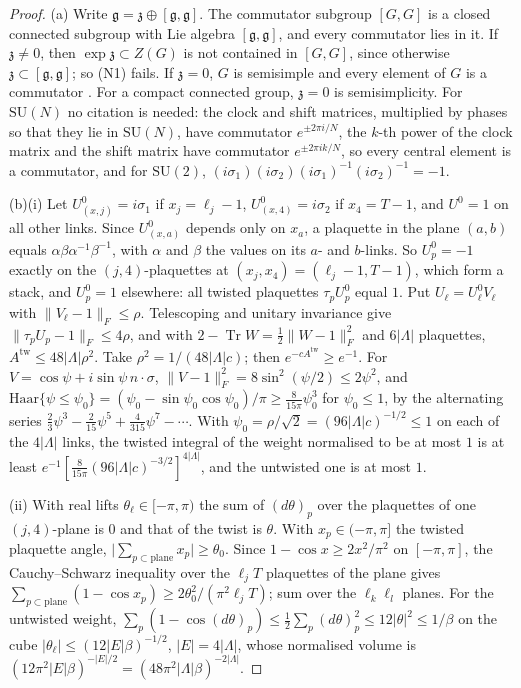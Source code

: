 \documentclass[11pt,a4paper]{amsart}
\theoremstyle{definition}
\theoremstyle{remark}
\numberwithin{equation}{section}
\DeclareMathOperator{\Tr}{Tr}        %
\newcommand{\norm}[1]{\lVert #1\rVert}     %
\newcommand{\abs}[1]{\lvert #1\rvert}      %
\newcommand{\SU}{\mathrm{SU}}              %
\begin{document}
\begin{proof}
(a) Write $\mathfrak g=\mathfrak z\oplus[\mathfrak g,\mathfrak g]$. The commutator subgroup $[G,G]$ is a closed connected subgroup with Lie algebra $[\mathfrak g,\mathfrak g]$, and every commutator lies in it. If $\mathfrak z\ne0$, then $\exp\mathfrak z\subset Z(G)$ is not contained in $[G,G]$, since otherwise $\mathfrak z\subset[\mathfrak g,\mathfrak g]$; so (N1) fails. If $\mathfrak z=0$, $G$ is semisimple and every element of $G$ is a commutator \cite{goto1949}. For a compact connected group, $\mathfrak z=0$ is semisimplicity. For $\SU(N)$ no citation is needed: the clock and shift matrices, multiplied by phases so that they lie in $\SU(N)$, have commutator $e^{\pm2\pi i/N}$, the $k$-th power of the clock matrix and the shift matrix have commutator $e^{\pm2\pi ik/N}$, so every central element is a commutator, and for $\SU(2)$, $(i\sigma_1)(i\sigma_2)(i\sigma_1)^{-1}(i\sigma_2)^{-1}=-1$.

(b)(i) Let $U^0_{(x,j)}=i\sigma_1$ if $x_j=\ell_j-1$, $U^0_{(x,4)}=i\sigma_2$ if $x_4=T-1$, and $U^0=1$ on all other links. Since $U^0_{(x,a)}$ depends only on $x_a$, a plaquette in the plane $(a,b)$ equals $\alpha\beta\alpha^{-1}\beta^{-1}$, with $\alpha$ and $\beta$ the values on its $a$- and $b$-links. So $U^0_p=-1$ exactly on the $(j,4)$-plaquettes at $(x_j,x_4)=(\ell_j-1,T-1)$, which form a stack, and $U^0_p=1$ elsewhere: all twisted plaquettes $\tau_pU^0_p$ equal $1$. Put $U_\ell=U^0_\ell V_\ell$ with $\norm{V_\ell-1}_F\le\rho$. Telescoping and unitary invariance give $\norm{\tau_pU_p-1}_F\le4\rho$, and with $2-\Tr W=\frac12\norm{W-1}_F^2$ and $6\abs\Lambda$ plaquettes, $A^{\mathrm{tw}}\le48\abs\Lambda\rho^2$. Take $\rho^2=1/(48\abs\Lambda c)$; then $e^{-cA^{\mathrm{tw}}}\ge e^{-1}$. For $V=\cos\psi+i\sin\psi\,n\cdot\sigma$, $\norm{V-1}_F^2=8\sin^2(\psi/2)\le2\psi^2$, and $\mathrm{Haar}\{\psi\le\psi_0\}=(\psi_0-\sin\psi_0\cos\psi_0)/\pi\ge\frac8{15\pi}\psi_0^3$ for $\psi_0\le1$, by the alternating series $\frac23\psi^3-\frac2{15}\psi^5+\frac4{315}\psi^7-\cdots$. With $\psi_0=\rho/\sqrt2=(96\abs\Lambda c)^{-1/2}\le1$ on each of the $4\abs\Lambda$ links, the twisted integral of the weight normalised to be at most $1$ is at least $e^{-1}[\frac8{15\pi}(96\abs\Lambda c)^{-3/2}]^{4\abs\Lambda}$, and the untwisted one is at most $1$.

(ii) With real lifts $\theta_\ell\in[-\pi,\pi)$ the sum of $(d\theta)_p$ over the plaquettes of one $(j,4)$-plane is $0$ and that of the twist is $\theta$. With $x_p\in(-\pi,\pi]$ the twisted plaquette angle, $\abs{\sum_{p\subset\text{plane}}x_p}\ge\theta_0$. Since $1-\cos x\ge2x^2/\pi^2$ on $[-\pi,\pi]$, the Cauchy--Schwarz inequality over the $\ell_jT$ plaquettes of the plane gives $\sum_{p\subset\text{plane}}(1-\cos x_p)\ge2\theta_0^2/(\pi^2\ell_jT)$; sum over the $\ell_k\ell_l$ planes. For the untwisted weight, $\sum_p(1-\cos(d\theta)_p)\le\frac12\sum_p(d\theta)_p^2\le12\abs\theta^2\le1/\beta$ on the cube $\abs{\theta_\ell}\le(12\abs E\beta)^{-1/2}$, $\abs E=4\abs\Lambda$, whose normalised volume is $(12\pi^2\abs E\beta)^{-\abs E/2}=(48\pi^2\abs\Lambda\beta)^{-2\abs\Lambda}$.


\end{proof}
\end{document}
